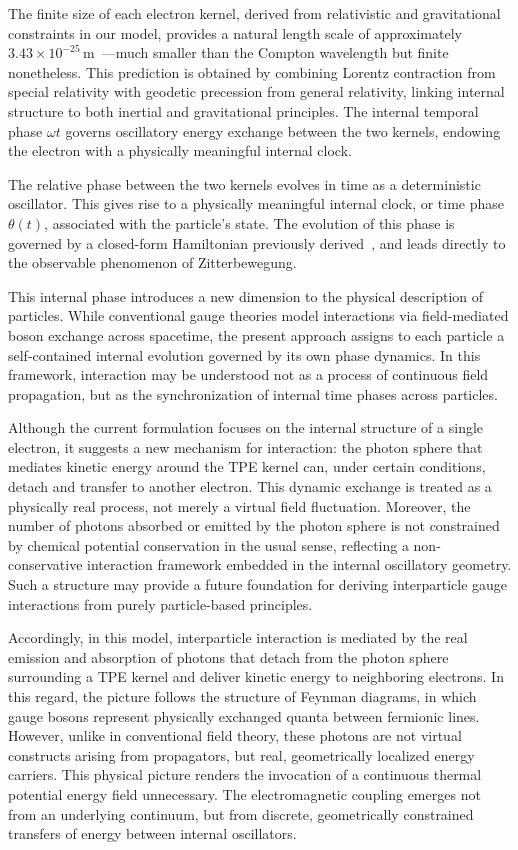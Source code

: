 \documentclass[%
 reprint,
 amsmath,amssymb,
 aps,
]{revtex4-1}
\numberwithin{equation}{section}%
\begin{document}
The finite size of each electron kernel, derived from relativistic and gravitational constraints in our model, provides a natural length scale of approximately \(3.43 \times 10^{-25} \, \text{m}\)~\cite{hanamura2024quantum}---much smaller than the Compton wavelength but finite nonetheless. This prediction is obtained by combining Lorentz contraction from special relativity with geodetic precession from general relativity, linking internal structure to both inertial and gravitational principles. The internal temporal phase $\omega t$ governs oscillatory energy exchange between the two kernels, endowing the electron with a physically meaningful internal clock.

The relative phase between the two kernels evolves in time as a deterministic oscillator. This gives rise to a physically meaningful internal clock, or time phase $\theta(t)$, associated with the particle’s state. The evolution of this phase is governed by a closed-form Hamiltonian previously derived~\cite{hanamura2023}, and leads directly to the observable phenomenon of Zitterbewegung.

This internal phase introduces a new dimension to the physical description of particles. While conventional gauge theories model interactions via field-mediated boson exchange across spacetime, the present approach assigns to each particle a self-contained internal evolution governed by its own phase dynamics. In this framework, interaction may be understood not as a process of continuous field propagation, but as the synchronization of internal time phases across particles.

Although the current formulation focuses on the internal structure of a single electron, it suggests a new mechanism for interaction: the photon sphere that mediates kinetic energy around the TPE kernel can, under certain conditions, detach and transfer to another electron. This dynamic exchange is treated as a physically real process, not merely a virtual field fluctuation. Moreover, the number of photons absorbed or emitted by the photon sphere is not constrained by chemical potential conservation in the usual sense, reflecting a non-conservative interaction framework embedded in the internal oscillatory geometry. Such a structure may provide a future foundation for deriving interparticle gauge interactions from purely particle-based principles.

Accordingly, in this model, interparticle interaction is mediated by the real emission and absorption of photons that detach from the photon sphere surrounding a TPE kernel and deliver kinetic energy to neighboring electrons. In this regard, the picture follows the structure of Feynman diagrams, in which gauge bosons represent physically exchanged quanta between fermionic lines. However, unlike in conventional field theory, these photons are not virtual constructs arising from propagators, but real, geometrically localized energy carriers. This physical picture renders the invocation of a continuous thermal potential energy field unnecessary. The electromagnetic coupling emerges not from an underlying continuum, but from discrete, geometrically constrained transfers of energy between internal oscillators.
\end{document}
